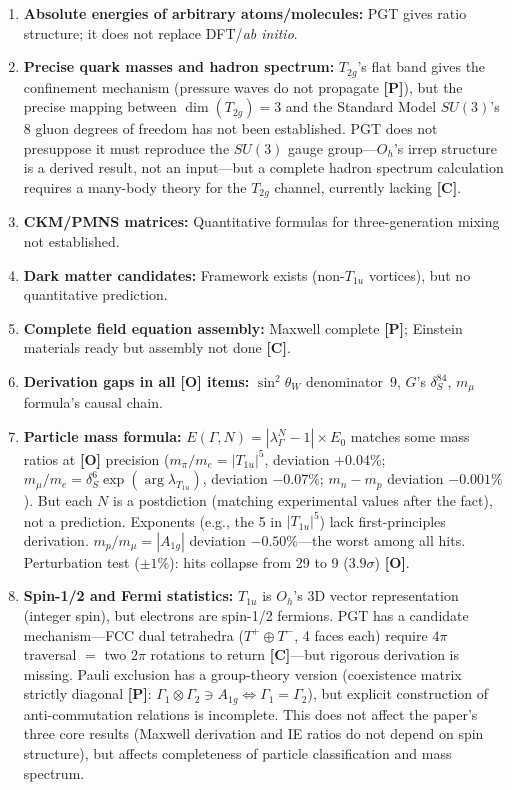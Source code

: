 \documentclass[11pt,a4paper]{article}
\newcommand{\gradeP}{\textbf{[P]}}
\newcommand{\gradeO}{\textbf{[O]}}
\newcommand{\gradeC}{\textbf{[C]}}
\begin{document}
\begin{enumerate}[leftmargin=*]
\item \textbf{Absolute energies of arbitrary atoms/molecules:} PGT gives ratio structure; it does not replace DFT/\emph{ab initio}.

\item \textbf{Precise quark masses and hadron spectrum:} $T_{2g}$'s flat band gives the confinement mechanism (pressure waves do not propagate \gradeP), but the precise mapping between $\dim(T_{2g})=3$ and the Standard Model $SU(3)$'s 8 gluon degrees of freedom has not been established. PGT does not presuppose it must reproduce the $SU(3)$ gauge group---$O_h$'s irrep structure is a derived result, not an input---but a complete hadron spectrum calculation requires a many-body theory for the $T_{2g}$ channel, currently lacking \gradeC.

\item \textbf{CKM/PMNS matrices:} Quantitative formulas for three-generation mixing not established.

\item \textbf{Dark matter candidates:} Framework exists (non-$T_{1u}$ vortices), but no quantitative prediction.

\item \textbf{Complete field equation assembly:} Maxwell complete \gradeP; Einstein materials ready but assembly not done \gradeC.

\item \textbf{Derivation gaps in all \gradeO{} items:} $\sin^2\theta_W$ denominator~9, $G$'s $\delta_S^{84}$, $m_\mu$ formula's causal chain.

\item \textbf{Particle mass formula:} $E(\Gamma,N) = |\lambda_\Gamma^N - 1|\times E_0$ matches some mass ratios at \gradeO{} precision ($m_\pi/m_e = |T_{1u}|^5$, deviation $+0.04\%$; $m_\mu/m_e = \delta_S^6\exp(\arg\lambda_{T_{1u}})$, deviation $-0.07\%$; $m_n-m_p$ deviation $-0.001\%$). But each $N$ is a postdiction (matching experimental values after the fact), not a prediction. Exponents (e.g., the 5 in $|T_{1u}|^5$) lack first-principles derivation. $m_p/m_\mu = |A_{1g}|$ deviation $-0.50\%$---the worst among all hits. Perturbation test ($\pm 1\%$): hits collapse from 29 to 9 ($3.9\sigma$) \gradeO.

\item \textbf{Spin-1/2 and Fermi statistics:} $T_{1u}$ is $O_h$'s 3D vector representation (integer spin), but electrons are spin-1/2 fermions. PGT has a candidate mechanism---FCC dual tetrahedra ($T^+\oplus T^-$, 4 faces each) require $4\pi$ traversal $=$ two $2\pi$ rotations to return \gradeC---but rigorous derivation is missing. Pauli exclusion has a group-theory version (coexistence matrix strictly diagonal \gradeP: $\Gamma_1\otimes\Gamma_2\ni A_{1g}\Leftrightarrow\Gamma_1=\Gamma_2$), but explicit construction of anti-commutation relations is incomplete. This does not affect the paper's three core results (Maxwell derivation and IE ratios do not depend on spin structure), but affects completeness of particle classification and mass spectrum.


\end{enumerate}
\end{document}
